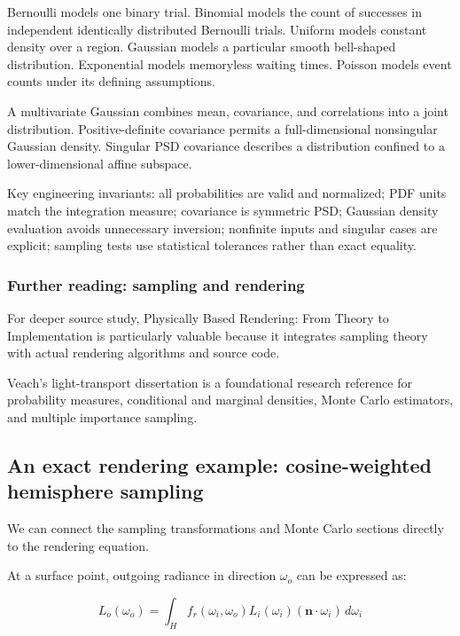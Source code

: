 Bernoulli models one binary trial. Binomial models the count of successes in independent identically distributed Bernoulli trials. Uniform models constant density over a region. Gaussian models a particular smooth bell-shaped distribution. Exponential models memoryless waiting times. Poisson models event counts under its defining assumptions.

A multivariate Gaussian combines mean, covariance, and correlations into a joint distribution. Positive-definite covariance permits a full-dimensional nonsingular Gaussian density. Singular PSD covariance describes a distribution confined to a lower-dimensional affine subspace.

Key engineering invariants: all probabilities are valid and normalized; PDF units match the integration measure; covariance is symmetric PSD; Gaussian density evaluation avoids unnecessary inversion; nonfinite inputs and singular cases are explicit; sampling tests use statistical tolerances rather than exact equality.

\subsubsection{Further reading: sampling and rendering}\label{02-foundations-ii-ch031-further-reading-sampling-and-rendering}

For deeper source study, Physically Based Rendering: From Theory to Implementation is particularly valuable because it integrates sampling theory with actual rendering algorithms and source code.

Veach's light-transport dissertation is a foundational research reference for probability measures, conditional and marginal densities, Monte Carlo estimators, and multiple importance sampling.

\subsection{An exact rendering example: cosine-weighted hemisphere sampling}\label{02-foundations-ii-ch031-an-exact-rendering-example-cosine-weighted-hemisphere-sampling}

We can connect the sampling transformations and Monte Carlo sections directly to the rendering equation.

At a surface point, outgoing radiance in direction \(\omega_o\) can be expressed as:

\[
 \boxed{ L_o(\omega_o) = \int_H f_r(\omega_i,\omega_o) L_i(\omega_i) (\mathbf n\cdot\omega_i)\,d\omega_i }
\]


